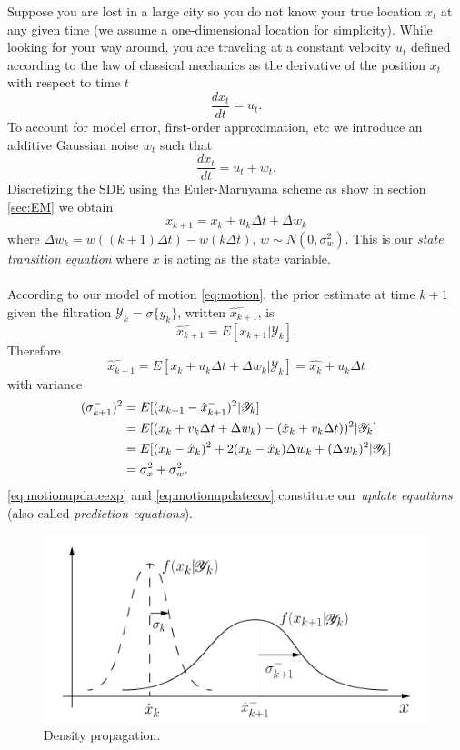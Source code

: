\documentclass{article}
\theoremstyle{definition}
\theoremstyle{remark}
\newcommand{\filtrationObs}[1]{\ensuremath{\mathscr{Y}_{#1}}}
\begin{document}
Suppose you are lost in a large city so you do not know your true location $x_t$ at any given time (we assume a one-dimensional location for simplicity). 
While looking for your way around, you are traveling at a constant velocity $u_t$ defined according to the law of classical mechanics as the derivative of the position $x_t$ with respect to time $t$ 
$$\frac{dx_t}{dt}=u_t.$$
To account for model error, first-order approximation, etc we introduce an additive Gaussian noise $w_t$ such that
$$\frac{dx_t}{dt}=u_t+w_t.$$
Discretizing the SDE using the Euler-Maruyama scheme as show in section \ref{sec:EM} we obtain
\begin{equation}\label{eq:motion}
x_{k+1}=x_k+u_k\Delta t+\Delta w_k
\end{equation}
where $\Delta w_k=w((k+1)\Delta t)-w(k\Delta t)$, $w \sim N(0,\sigma_w^2)$.
This is our \textit{state transition equation} where $x$ is acting as the state variable.\\
\\
According to our model of motion \eqref{eq:motion}, the prior estimate at time $k+1$ given the filtration $\filtrationObs{k}=\sigma\{y_k\}$, written $\hat{x}_{k+1}^-$, is
$$\hat{x}_{k+1}^-=E[x_{k+1}|\filtrationObs{k}].$$
Therefore
\begin{equation}\label{eq:motionupdateexp}
\hat{x}_{k+1}^-=E[x_k+u_k\Delta t+\Delta w_k|\filtrationObs{k}]=\hat{x_k}+u_k\Delta t
\end{equation}
with variance
\begin{align}\label{eq:motionupdatecov}
(\sigma_{k+1}^-)^2&=E[(x_{k+1}-\hat{x}_{k+1}^-)^2|\filtrationObs{k}] \notag\\
&=E[(x_{k}+v_k\Delta t+\Delta w_k)-(\hat{x}_{k}+v_k\Delta t))^2|\filtrationObs{k}] \notag\\
&=E[(x_{k}-\hat{x}_{k})^2+2(x_{k}-\hat{x}_{k})\Delta w_k+(\Delta w_k)^2|\filtrationObs{k}] \notag\\
&=\sigma_x^2+\sigma_w^2.
\end{align}
\eqref{eq:motionupdateexp} and \eqref{eq:motionupdatecov} constitute our \textit{update equations} (also called \textit{prediction equations}). \\
\begin{figure}[h!]
	\centering
	\includegraphics[width=.5\textwidth]{example_propagation.png}
	\caption{Density propagation.}
\end{figure}
\end{document}
